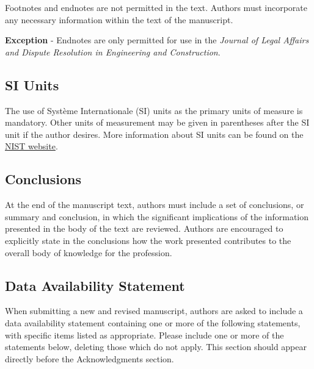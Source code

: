 \documentclass[Journal,LineNumbers]{ascelike-new}
\begin{document}
Footnotes and endnotes are not permitted in the text. Authors must
incorporate any necessary information within the text of the manuscript.

\textbf{Exception} - Endnotes are only permitted for use in the
\emph{Journal of Legal Affairs and Dispute Resolution in Engineering and
Construction}.

\subsection{SI Units}\label{si-units}

The use of Système Internationale (SI) units as the primary units of
measure is mandatory. Other units of measurement may be given in
parentheses after the SI unit if the author desires. More information
about SI units can be found on the
\href{http://physics.nist.gov/cuu/Units/index.html}{NIST website}.

\subsection{Conclusions}\label{conclusions}

At the end of the manuscript text, authors must include a set of
conclusions, or summary and conclusion, in which the significant
implications of the information presented in the body of the text are
reviewed. Authors are encouraged to explicitly state in the conclusions
how the work presented contributes to the overall body of knowledge for
the profession.

\subsection{Data Availability
Statement}\label{data-availability-statement}

When submitting a new and revised manuscript, authors are asked to
include a data availability statement containing one or more of the
following statements, with specific items listed as appropriate. Please
include one or more of the statements below, deleting those which do not
apply. This section should appear directly before the Acknowledgments
section.
\end{document}
